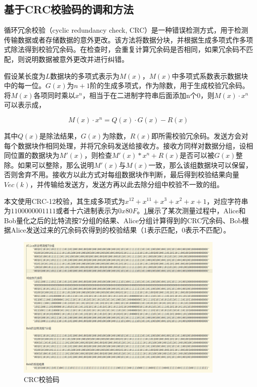 \documentclass[master]{seuthesis} %
\begin{document}
\begin{Main}
\subsection{基于CRC校验码的调和方法}

循环冗余校验（cyclic redundancy check, CRC）是一种错误检测方式，用于检测传输数据或者存储数据的意外更改。该方法将数据分块，并根据生成多项式作多项式除法得到校验冗余码。在检查时，会重复计算冗余码是否相同，如果冗余码不匹配，则说明数据被意外更改并进行纠错。

假设某长度为$L$数据块的多项式表示为$M(x)$，$M(x)$中多项式系数表示数据块中的每一位。$G(x)$为$n+1阶$的生成多项式，作为除数，用于生成校验冗余码。将$M(x)$各项同时乘以$x^n$，相当于在二进制字符串后面添加n个0，则$M(x) \cdot x^n$可以表示成，

\begin{equation}
    M(x) \cdot x^n = Q(x) \cdot G(x) - R(x) 
\end{equation}

其中$Q(x)$是除法结果，$G(x)$为除数，$R(x)$即所需校验冗余码。发送方会对每个数据块作相同处理，并将冗余码发送给接收方。接收方同样对数据分组，设相同位置的数据块为$M'(x)$，则检查$M'(x) * x^n + R(x)$是否可以被$G(x)$整除。如果可以整除，那么说明$M'(x)$与$M(x)$一致，那么该组数据块可以保留，否则舍弃不用。接收方以此方式对每组数据块作判断，最后得到校验结果向量$Vec(k)$，并传输给发送方，发送方再以此去除分组中校验不一致的组。

本文使用CRC-12校验，其生成多项式为$x^{12}+x^{11}+x^{3}+x^{2}+x+1$，对应字符串为$1100000001111$或者十六进制表示为$0x80F$。\ref{bitstream_and_crccode}展示了某次测量过程中，Alice和Bob量化之后的比特流按7分组的结果、Alice分组计算得到的CRC冗余码、Bob根据Alice发送过来的冗余码农得到的校验结果（1表示匹配，0表示不匹配）。

\begin{figure}[htbp!]
    \centering \includegraphics[width=0.9\textwidth]{images/bitstream_and_crccode} 
    \caption{CRC校验码}
    \label{bitstream_and_crccode}
\end{figure}


\end{Main}
\end{document}
